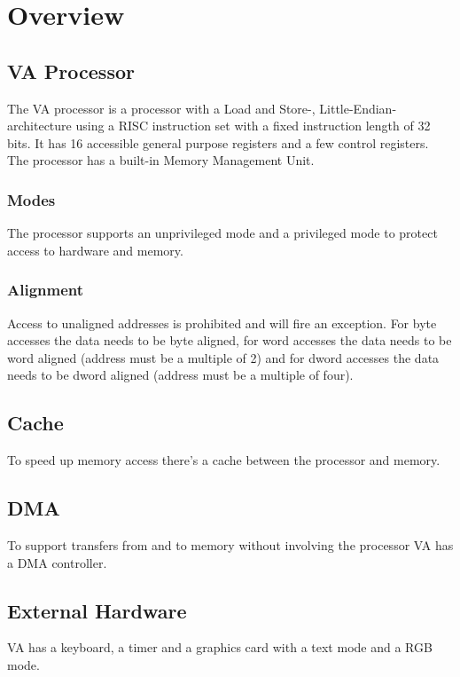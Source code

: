 \section{Overview}

\subsection{VA Processor}

The VA processor is a processor with a Load and Store-, Little-Endian-architecture using a RISC instruction set with a fixed instruction length of 32 bits. It has 16 accessible general purpose registers and a few control registers. The processor has a built-in Memory Management Unit. 

\subsubsection{Modes}

The processor supports an unprivileged mode and a privileged mode to protect access to hardware and memory. 

\subsubsection{Alignment}

Access to unaligned addresses is prohibited and will fire an exception. For byte accesses the data
needs to be byte aligned, for word accesses the data needs to be word aligned (address must be a multiple of 2) and for dword accesses the data needs to be dword aligned (address must be a multiple of four). 

\subsection{Cache}

To speed up memory access there's a cache between the processor and memory. 

\subsection{DMA}

To support transfers from and to memory without involving the processor VA has a \Gls{DMA} controller.

\subsection{External Hardware}

VA has a keyboard, a timer and a graphics card with a text mode and a RGB mode. 
